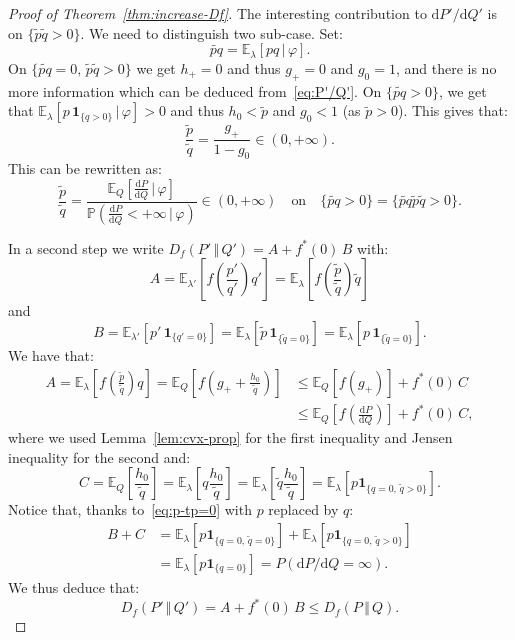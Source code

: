 \documentclass[12pt]{article}
\newcommand{\E}{{\mathbb E}}
\renewcommand{\P}{{\mathbb P}}
\newcommand{\ind}{\mathbf{1}}
\newcommand{\rd}{\mathrm{d}}
\theoremstyle{plain}
\theoremstyle{remark}
\begin{document}
\begin{proof}[Proof of Theorem~\ref{thm:increase-Df}]
 The interesting contribution to $\rd P'/\rd Q'$ is on $\{ \tilde p\tilde  q >0\}$. We need to distinguish two sub-case. Set:
 \[
   \widetilde {pq} =\E_\lambda [pq\, |\, \varphi].
 \]
 On $\{ \widetilde {pq}=0, \, \tilde p \tilde q >0\}$ we get $h_+=0$ and
 thus  $g_+=0$   and  $g_0=1$,   and  there   is  no   more  information
 which can be deduced from~\eqref{eq:P'/Q'}.
 On $\{ \widetilde {pq}>0\}$, we get that $\E_\lambda[ p\,
 \ind_{\{q>0\}} \, |\, \varphi]>0$ and thus $h_0< \tilde p$ and $g_0<1$
 (as $\tilde p>0$). This gives that:
 \[
   \frac{\tilde p}{\tilde q}= \frac{g_+}{1- g_0}\in (0, +\infty ).
 \]
 This can be rewritten as:
 \[
   \frac{\tilde p}{\tilde q}=
   \frac{\E_Q\left[\frac{\rd P}{\rd Q} \, \big |\, \varphi\right]}
   {\P\left(\frac{\rd P}{\rd Q}<+\infty  \, \big |\, \varphi\right)}
   \in (0, +\infty )
   \quad\text{on}\quad
  \{ \widetilde {pq}>0\}=  \{ \widetilde {pq} \tilde p \tilde q>0\}.
 \]

 \medskip


In a second step
we
write  $  D_f (P' \, \Vert\, Q')=A+ f^*(0) \,  B$ with:
\[
  A= \E_{\lambda'} \left[ f\left(\frac{p'}{q'} \right)
    q'\right]
  =\E_{\lambda} \left[ f\left(\frac{\tilde p}{\tilde q} \right)
    \tilde q\right]
    \]
and
\[
B=\E_{\lambda'} [p'\, \ind_{\{q'=0\}}]
=\E_{\lambda} [\tilde p\, \ind_{\{\tilde q=0\}}]
=\E_{\lambda} [ p\, \ind_{\{\tilde q=0\}}].
\]
We have  that:
\begin{align}
  \label{eq:A1-majo1}
  A= \E_{\lambda} \left[ f\left(\frac{\tilde p}{\tilde q} \right)
     q\right]
  = \E_Q\left[ f\left(g_+ + \frac{h_0 }{\tilde q}  \right)\right]
 & \leq  \E_Q[f(g_+)] + f^*(0)\, C\\
  \label{eq:A1-majo2}
 & \leq  \E_Q\left[f\left(\frac{\rd P}{\rd Q}\right)\right] +
   f^*(0)\,C,
 \end{align}
where we used  Lemma~\ref{lem:cvx-prop} for the first inequality and
Jensen inequality for the second and:
\begin{equation}
   \label{eq:C}
  C=  \E_Q \left[\frac{h_0 }{\tilde q}  \right]
  = \E_\lambda \left[ q \frac{h_0}{\tilde q}  \right]
  = \E_\lambda \left[ \tilde q  \frac{h_0}{\tilde q}  \right]
  =\E_\lambda \left[ p \ind_{\{q=0, \, \tilde q>0\}}  \right].
\end{equation}
Notice that, thanks to~\eqref{eq:p-tp=0} with $p$ replaced by $q$:
\begin{align*}
  B+C &= \E_\lambda \left[ p \ind_{\{q=0, \, \tilde q=0\}}  \right]
  + \E_\lambda \left[ p \ind_{\{q=0, \, \tilde q>0\}}  \right] \\
  &=\E_\lambda \left[ p \ind_{\{q=0\}}  \right]
  =P( \rd P/\rd Q=\infty ).    
\end{align*}
We thus deduce that:
\[
   D_f (P' \, \Vert\, Q')=A+ f^*(0) \,  B \leq   D_f (P \, \Vert\,
   Q).
 \]




\end{proof}
\end{document}
